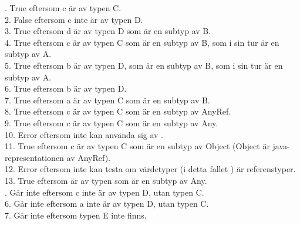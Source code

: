. True eftersom c är av typen C. \\
2. False eftersom c inte är av typen D. \\
3. True eftersom d är av typen D som är en subtyp av B. \\
4. True eftersom c är av typen C som är en subtyp av B, som i sin tur är en subtyp av A. \\
5. True eftersom b är av typen D, som är en subtyp av B, som i sin tur är en subtyp av A. \\
6. True eftersom b är av typen D. \\
7. True eftersom a är av typen C som är en subtyp av B. \\
8. True eftersom c är av typen C som är en subtyp av AnyRef. \\
9. True eftersom c är av typen C som är en subtyp av Any. \\
10. Error eftersom  inte kan använda sig av .  \\
11. True eftersom c är av typen C som är en subtyp av Object (Object är java-representationen av AnyRef). \\
12. Error eftersom  inte kan testa om värdetyper (i detta fallet ) är referenstyper. \\
13. True eftersom  är av typen  som är en subtyp av Any. \\

. Går inte eftersom c inte är av typen D, utan typen C. \\
6. Går inte eftersom a inte är av typen D, utan typen C. \\
7. Går inte eftersom typen E inte finns. \\

\Task

